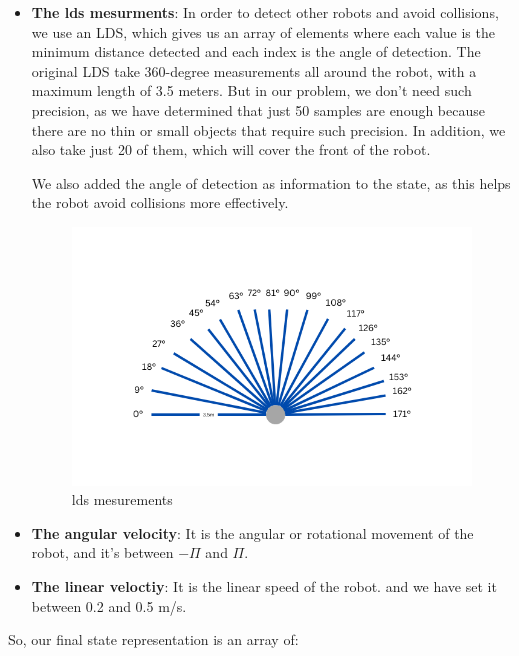 \documentclass[12pt]{extarticle}
\begin{document}
\begin{itemize}
\item \textbf{The lds  mesurments}: 
In order to detect other robots and avoid collisions, we use an LDS, which gives us an array of elements where each value is the minimum distance detected and each index is the angle of detection.
The original LDS take 360-degree measurements all around the robot, with a maximum length of 3.5 meters. But in our problem, we don't need such precision, as we have determined that just 50 samples are enough because there are no thin or small objects that require such precision. In addition, we also take just 20 of them, which will cover the front of the robot.

We also added the angle of detection as information to the state, as this helps the robot avoid collisions more effectively.

 \begin{figure}[h]  
\centering
\includegraphics[scale=0.85]{lds3}
\caption[lds mesurement]{lds mesurements}
\end{figure}






\item \textbf{The angular velocity}: 
It is the angular or rotational movement of the robot, and it's between 
$ -\Pi $ and $\Pi$.

\item \textbf{The linear veloctiy}: 
It is the linear speed of the robot. and we have set it between 0.2 and 0.5 m/s.

\end{itemize}



So, our final state representation is an array of:
\end{document}
